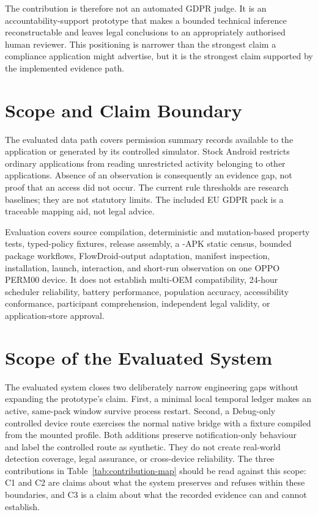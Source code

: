 The contribution is therefore not an automated GDPR judge. It is an accountability-support prototype that makes a bounded technical inference reconstructable and leaves legal conclusions to an appropriately authorised human reviewer. This positioning is narrower than the strongest claim a compliance application might advertise, but it is the strongest claim supported by the implemented evidence path.

\section{Scope and Claim Boundary}

The evaluated data path covers permission summary records available to the application or generated by its controlled simulator. Stock Android restricts ordinary applications from reading unrestricted activity belonging to other applications. Absence of an observation is consequently an evidence gap, not proof that an access did not occur. The current rule thresholds are research baselines; they are not statutory limits. The included EU GDPR pack is a traceable mapping aid, not legal advice.

Evaluation covers source compilation, deterministic and mutation-based property tests, typed-policy fixtures, release assembly, a \FDroidCensusN{}-APK static census, \DevicePackagesN{} bounded package workflows, FlowDroid-output adaptation, manifest inspection, installation, launch, interaction, and short-run observation on one OPPO PERM00 device. It does not establish multi-OEM compatibility, 24-hour scheduler reliability, battery performance, population accuracy, accessibility conformance, participant comprehension, independent legal validity, or application-store approval.

\section{Scope of the Evaluated System}

The evaluated system closes two deliberately narrow engineering gaps without expanding the prototype's claim. First, a minimal local temporal ledger makes an active, same-pack window survive process restart. Second, a Debug-only controlled device route exercises the normal native bridge with a fixture compiled from the mounted profile. Both additions preserve notification-only behaviour and label the controlled route as synthetic. They do not create real-world detection coverage, legal assurance, or cross-device reliability. The three contributions in Table~\ref{tab:contribution-map} should be read against this scope: C1 and C2 are claims about what the system preserves and refuses within these boundaries, and C3 is a claim about what the recorded evidence can and cannot establish.

